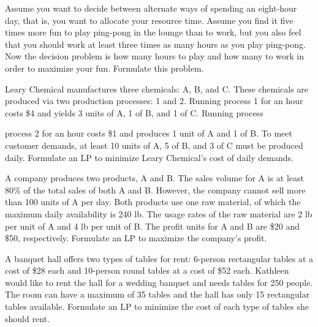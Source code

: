 \begin{Ejer} Assume you want to decide between alternate ways of spending an eight-hour day, that is, you want to allocate your resource time. Assume you find it five times more fun to play ping-pong in the lounge than to work, but you also feel that you should work at least three times as many hours as you play ping-pong. Now the decision problem is how many hours to play and how many to work in order to maximize your fun. Formulate this problem.

\end{Ejer}

\begin{Ejer} Leary Chemical manufactures three chemicals: A, B, and C. These chemicals are produced via two production processes: 1 and 2. Running process 1 for an hour costs \$4 and yields 3 units of A, 1 of B, and 1 of C. Running process
\end{Ejer}



\begin{Ejer}
process 2 for an hour costs \$1 and produces 1 unit of A and 1 of B. To meet customer demands, at least 10 units of A, 5 of B, and 3 of C must be produced daily. Formulate an LP to minimize Leary Chemical's cost of daily demands.

\end{Ejer}

\begin{Ejer} A company produces two products, A and B. The sales volume for A is at least 80\% of the total sales of both A and B. However, the company cannot sell more than 100 units of A per day. Both products use one raw material, of which the maximum daily availability is 240 lb. The usage rates of the raw material are 2 lb per unit of A and 4 lb per unit of B. The profit units for A and B are \$20 and \$50, respectively. Formulate an LP to maximize the company's profit.

\end{Ejer}

\begin{Ejer} A banquet hall offers two types of tables for rent: 6-person rectangular tables at a cost of \$28 each and 10-person round tables at a cost of \$52 each. Kathleen would like to rent the hall for a wedding banquet and needs tables for 250 people. The room can have a maximum of 35 tables and the hall has only 15 rectangular tables available. Formulate an LP to minimize the cost of each type of tables she should rent.

\end{Ejer}

